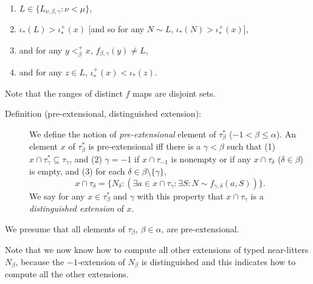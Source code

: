 \documentclass[112pt]{article}
\begin{document}
\begin{description}
\begin{enumerate}
\item $L \in  \{L_{\nu,\beta,\gamma}:\nu < \mu\}$, 

\item  $\iota_*(L)>\iota^+_*(x)$ [and so for any $N \sim L$, $\iota_*(N)>\iota^+_*(x)$], 

\item and for any $y<_\beta^+ x$, $f_{\beta,\gamma}(y) \neq L$, \item  and for any $z \in L$, $\iota^+_*(x) < \iota_*(z)$.
\end{enumerate}

Note that the ranges of distinct $f$ maps are disjoint sets.

\end{description}

\begin{comment}

Look at Sky's approach

\end{comment}

\begin{description}

\item[Definition (pre-extensional, distinguished extension):]  We define the notion of {\em pre-extensional\/} element of $\tau^*_\beta$ ($-1 <\beta \leq \alpha$).   An element $x$ of $\tau^*_\beta$ is pre-extensional iff there is a $\gamma<\beta$ such that (1) $x \cap \tau^*_\gamma \subseteq \tau_\gamma$, and (2) $\gamma=-1$ if
$x \cap \tau_{-1}$ is nonempty or if any $x \cap \tau_\delta$ ($\delta \in \beta$) is empty,  and (3) for each $\delta \in \beta \setminus \{\gamma\}$, $$x \cap \tau_\delta= \{N_\delta:(\exists a \in x\cap \tau_\gamma:\exists S:N \sim f_{\gamma,\delta}(a,S))\}.$$  We say for any $x \in \tau^*_\beta$ and $\gamma$ with this property that $x \cap \tau_\gamma$ is a {\em distinguished extension\/} of $x$.

\end{description}

We presume that all elements of $\tau_\beta$, $\beta\in \alpha$, are pre-extensional. 

 

Note that we now know how to compute all other extensions of typed near-litters $N_\beta$, because the $-1$-extension of $N_\beta$ is distinguished and this indicates how to compute all the other extensions.
\end{document}
